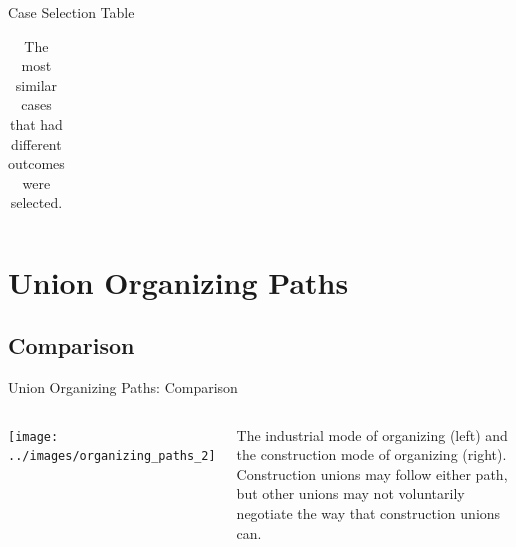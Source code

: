\documentclass{beamer}
\begin{document}
\begin{frame}{Case Selection Table}
\begin{table}[]
\begin{tabular}{@{}llll@{}}
            \bottomrule
        \end{tabular}
        \caption{The most similar cases that had different outcomes were selected.}
        \label{tab:my-table}
    \end{table}
\end{frame}


\section*{Union Organizing Paths}
%    
%    
%

\subsection*{Comparison}

\begin{frame}{Union Organizing Paths: Comparison} %
  \begin{columns}
    \texttt{[image: ../images/organizing\_paths\_2]}

    The industrial mode of organizing (left) and the construction mode of organizing (right).\newline\newline
    Construction unions may follow either path, but other unions may not voluntarily negotiate the way that construction unions can.
    \end{columns}
\end{frame}
\end{document}
